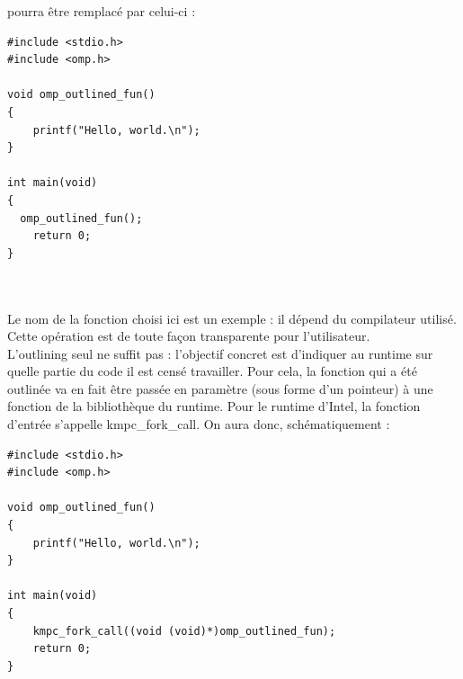 \documentclass{report}
\begin{document}
pourra être remplacé par celui-ci :
\begin{lstlisting}
#include <stdio.h>
#include <omp.h>

void omp_outlined_fun()
{
    printf("Hello, world.\n");
}

int main(void)
{
  omp_outlined_fun();
    return 0;
}



\end{lstlisting}
Le nom de la fonction choisi ici est un exemple : il dépend du compilateur utilisé. Cette opération est
de toute façon transparente pour l'utilisateur. 
\\L'outlining seul ne suffit pas : l'objectif concret est d'indiquer au runtime sur quelle partie du code
il est censé travailler. Pour cela, la fonction qui a été outlinée va en fait être passée en paramètre
(sous forme d'un pointeur) à une fonction de la bibliothèque du runtime. Pour le runtime d'Intel, la 
fonction d'entrée s'appelle kmpc\_fork\_call. On aura donc, schématiquement : 

\begin{lstlisting}
#include <stdio.h>
#include <omp.h>

void omp_outlined_fun()
{
    printf("Hello, world.\n");
}

int main(void)
{
    kmpc_fork_call((void (void)*)omp_outlined_fun);
    return 0;
}

\end{lstlisting}
\end{document}
